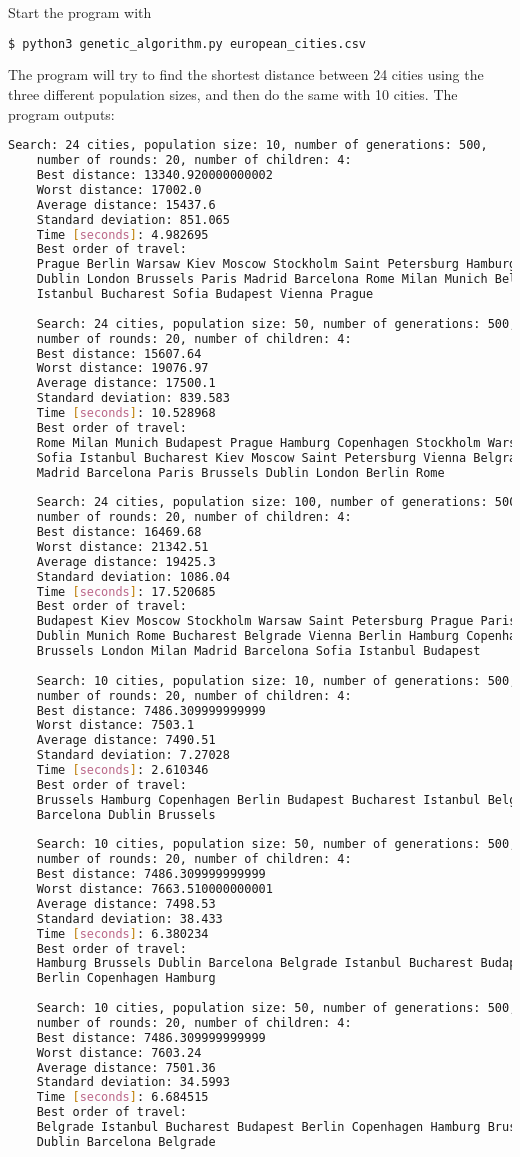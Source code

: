 \documentclass{article}
\begin{document}
Start the program with
\begin{lstlisting}[language=bash]
	$ python3 genetic_algorithm.py european_cities.csv 
\end{lstlisting}
The program will try to find the shortest distance between 24 cities using the three different population sizes, and then do the same with 10 cities. The program outputs:
\begin{lstlisting}[language=bash]
	Search: 24 cities, population size: 10, number of generations: 500, 
	number of rounds: 20, number of children: 4: 
	Best distance: 13340.920000000002
	Worst distance: 17002.0
	Average distance: 15437.6
	Standard deviation: 851.065
	Time [seconds]: 4.982695
	Best order of travel: 
	Prague Berlin Warsaw Kiev Moscow Stockholm Saint Petersburg Hamburg Copenhagen 
	Dublin London Brussels Paris Madrid Barcelona Rome Milan Munich Belgrade 
	Istanbul Bucharest Sofia Budapest Vienna Prague
 
	Search: 24 cities, population size: 50, number of generations: 500, 
	number of rounds: 20, number of children: 4: 
	Best distance: 15607.64
	Worst distance: 19076.97
	Average distance: 17500.1
	Standard deviation: 839.583
	Time [seconds]: 10.528968
	Best order of travel: 
	Rome Milan Munich Budapest Prague Hamburg Copenhagen Stockholm Warsaw 
	Sofia Istanbul Bucharest Kiev Moscow Saint Petersburg Vienna Belgrade 
	Madrid Barcelona Paris Brussels Dublin London Berlin Rome
 
	Search: 24 cities, population size: 100, number of generations: 500, 
	number of rounds: 20, number of children: 4: 
	Best distance: 16469.68
	Worst distance: 21342.51
	Average distance: 19425.3
	Standard deviation: 1086.04
	Time [seconds]: 17.520685
	Best order of travel: 
	Budapest Kiev Moscow Stockholm Warsaw Saint Petersburg Prague Paris 
	Dublin Munich Rome Bucharest Belgrade Vienna Berlin Hamburg Copenhagen 
	Brussels London Milan Madrid Barcelona Sofia Istanbul Budapest
 
	Search: 10 cities, population size: 10, number of generations: 500, 
	number of rounds: 20, number of children: 4: 
	Best distance: 7486.309999999999
	Worst distance: 7503.1
	Average distance: 7490.51
	Standard deviation: 7.27028
	Time [seconds]: 2.610346
	Best order of travel: 
	Brussels Hamburg Copenhagen Berlin Budapest Bucharest Istanbul Belgrade 
	Barcelona Dublin Brussels
 
	Search: 10 cities, population size: 50, number of generations: 500, 
	number of rounds: 20, number of children: 4: 
	Best distance: 7486.309999999999
	Worst distance: 7663.510000000001
	Average distance: 7498.53
	Standard deviation: 38.433
	Time [seconds]: 6.380234
	Best order of travel: 
	Hamburg Brussels Dublin Barcelona Belgrade Istanbul Bucharest Budapest 
	Berlin Copenhagen Hamburg
 
	Search: 10 cities, population size: 50, number of generations: 500, 
	number of rounds: 20, number of children: 4: 
	Best distance: 7486.309999999999
	Worst distance: 7603.24
	Average distance: 7501.36
	Standard deviation: 34.5993
	Time [seconds]: 6.684515
	Best order of travel: 
	Belgrade Istanbul Bucharest Budapest Berlin Copenhagen Hamburg Brussels 
	Dublin Barcelona Belgrade
\end{lstlisting}
\end{document}
